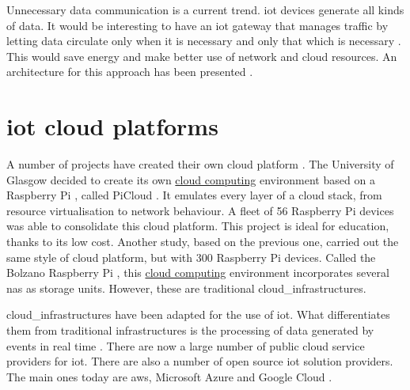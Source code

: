 Unnecessary data communication is a current trend. \acrshort{iot} devices generate all kinds of data. It would be interesting to have an \acrshort{iot} gateway that manages traffic by letting data circulate only when it is necessary and only that which is necessary \cite{cloud_of_thing}. This would save energy and make better use of network and \gls{cloud} resources. An architecture for this approach has been presented \cite{unnecessary_data_architecture}.


\section{\texorpdfstring{\acrshort{iot}}{} \texorpdfstring{\gls{cloud}}{} platforms}
\label{subsec:cloud_providers}

A number of projects have created their own \gls{cloud} platform \cite{Ilyas_Ahmad_Saleem_2020}. The University of Glasgow decided to create its own \hyperref[subsec:cloudcomputing]{cloud computing} environment based on a Raspberry Pi \cite{raspberrypi}, called PiCloud \cite{glasgow_rpi_cloud_computing}. It emulates every layer of a \gls{cloud} stack, from resource virtualisation to network behaviour. A fleet of 56 Raspberry Pi devices was able to consolidate this \gls{cloud} platform. This project is ideal for education, thanks to its low cost. Another study, based on the previous one, carried out the same style of \gls{cloud} platform, but with 300 Raspberry Pi devices. Called the Bolzano Raspberry Pi \cite{bolzano_rpi_cloud_computing}, this \hyperref[subsec:cloudcomputing]{cloud computing} environment incorporates several \acrfull{nas} as storage units. However, these are traditional \glspl{cloud_infrastructure}.

\Glspl{cloud_infrastructure} have been adapted for the use of \acrshort{iot}. What differentiates them from traditional infrastructures is the processing of data generated by events in real time \cite{Sikarwar_Yadav_Dubey_2020}. There are now a large number of public \gls{cloud} service providers for \acrshort{iot}. There are also a number of open source \acrshort{iot} solution providers. The main ones today are \gls{aws}, Microsoft Azure and Google Cloud \cite{gartner_cloud_providers_ranking}.

